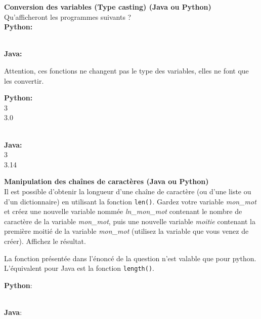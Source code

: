 \begin{Exercice}[5 minutes] \textbf{Conversion des variables (Type casting) (Java ou Python)}\\
   Qu'afficheront les programmes suivants ? \\
   
   \textbf{Python:}
   
   
   \textbf{\\Java:}
   
    
   
    \begin{conseil}
      	Attention, ces fonctions ne changent pas le type des variables, elles ne font que les convertir.
        
    \end{conseil}
    \begin{solution}
     
    \textbf{Python:}\\
    3\\
    3.0
    
    \textbf{\\Java:}\\
    3\\
    3.14 \\
           
    \end{solution}   
\end{Exercice}



\begin{Exercice}[10 minutes] \textbf{Manipulation des chaînes de caractères (Java ou Python)}\\
   Il est possible d'obtenir la longueur d'une chaîne de caractère (ou d'une liste ou d'un dictionnaire) en utilisant la fonction \lstinline{len()}. Gardez votre variable \textit{mon\_mot} et créez une nouvelle variable nommée \textit{ln\_mon\_mot} contenant le nombre de caractère de la variable \textit{mon\_mot}, puis une nouvelle variable \textit{moitie} contenant la première moitié de la variable \textit{mon\_mot} (utilisez la variable que vous venez de créer). Affichez le résultat.   \\
   
    \begin{conseil}
      	La fonction présentée dans l'énoncé de la question n'est valable que pour python. L'équivalent pour Java est la fonction \lstinline{length()}.
        
    \end{conseil}
    \begin{solution}
    
    \textbf{Python}:
    
    
    \textbf{\\Java}:
    
    \end{solution}   
\end{Exercice}



